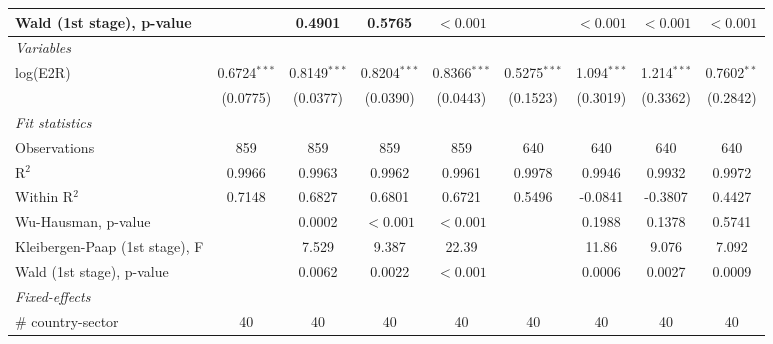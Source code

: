 \documentclass[a4paper]{article}
\begin{document}
\begin{table}[h!]
{\begin{tabular}{lcccccccc}
      Wald (1st stage), p-value &                   & 0.4901                & 0.5765                 & $<0.001$  &                    & $<0.001$  & $<0.001$   & $<0.001$\\
      \midrule
       \emph{Variables}\\
      log(E2R)                            & 0.6724$^{***}$     & 0.8149$^{***}$        & 0.8204$^{***}$         & 0.8366$^{***}$         & 0.5275$^{***}$     & 1.094$^{***}$         & 1.214$^{***}$          & 0.7602$^{**}$\\   
                                          & (0.0775)           & (0.0377)              & (0.0390)               & (0.0443)               & (0.1523)           & (0.3019)              & (0.3362)               & (0.2842)\\  
      \emph{Fit statistics}\\
      Observations                        & 859                & 859                   & 859                    & 859                    & 640                & 640                   & 640                    & 640\\  
      R$^2$                               & 0.9966             & 0.9963                & 0.9962                 & 0.9961                 & 0.9978             & 0.9946                & 0.9932                 & 0.9972\\  
      Within R$^2$                        & 0.7148             & 0.6827                & 0.6801                 & 0.6721                 & 0.5496             & -0.0841               & -0.3807                & 0.4427\\  
      Wu-Hausman, p-value     &                    & 0.0002                 & $<0.001$               & $<0.001$               &                    & 0.1988                & 0.1378                 & 0.5741\\  
     Kleibergen-Paap (1st stage), F                     &                    & 7.529                 & 9.387                  & 22.39                  &                    & 11.86                 & 9.076                  & 7.092\\  
      Wald (1st stage), p-value &                    & 0.0062                & 0.0022                 & $<0.001$  &                    & 0.0006                & 0.0027                 & 0.0009\\ 
      \midrule
      \emph{Fixed-effects}\\
      \# country-sector       & 40                 & 40                    & 40                     & 40                    & 40                 & 40                    & 40                     & 40\\  

\end{tabular}}
\end{table}
\end{document}
